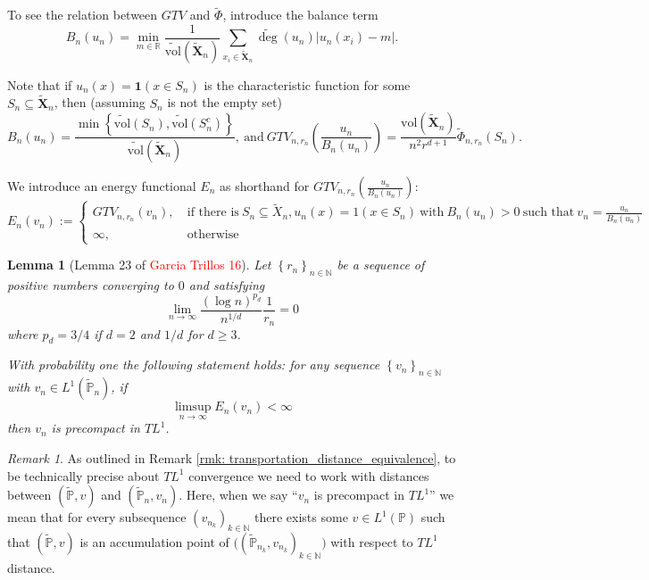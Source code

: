 \documentclass{article}
\newcommand{\Reals}{\mathbb{R}}
\newcommand{\abs}[1]{\left \lvert #1 \right \rvert}
\newcommand{\set}[1]{\left\{#1\right\}}
\newcommand{\seq}[1]{\set{#1}_{n \in \N}}
\newcommand{\Naturals}{\mathbb{N}}
\newcommand{\N}{\mathbb{N}}
\newcommand{\Xbf}{\mathbf{X}}
\newcommand{\Pbb}{\mathbb{P}}
\newcommand{\1}{\mathbf{1}}
\newcommand{\vol}{\mathrm{vol}}
\theoremstyle{alden}
\theoremstyle{aldenthm}
\newtheorem{lemma}{Lemma}
\theoremstyle{remark}
\newtheorem{remark}{Remark}
\begin{document}
To see the relation between $GTV$ and $\widetilde{\Phi}$, introduce the balance term
\begin{equation*}
B_n(u_n) = \min_{m \in \Reals} \frac{1}{\widetilde{\vol}(\widetilde{\Xbf}_n)} \sum_{x_i \in \widetilde{\Xbf}_n} \widetilde{\deg}(u_n) \abs{u_n(x_i) - m}.
\end{equation*}

Note that if $u_n(x) = \1(x \in S_n)$ is the characteristic function for some $S_n \subseteq \widetilde{\Xbf}_n$, then (assuming $S_n$ is not the empty set)
\begin{equation*}
B_n(u_n) = \frac{\min \set{ \widetilde{\vol}(S_n) , \widetilde{\vol}(S_n^c) }}{\widetilde{\vol}(\widetilde{\Xbf}_n)}, ~\text{and}~ GTV_{n,r_n}\left(\frac{u_n}{B_n(u_n)}\right) = \frac{\vol(\widetilde{\Xbf}_n)}{n^2 r^{d+1}}\widetilde{\Phi}_{n,r_n}(S_n).
\end{equation*}

We introduce an energy functional $E_n$ as shorthand for $GTV_{n,r_n}\left(\frac{u_n}{B_n(u_n)}\right)$:
\begin{equation*}
E_n(v_n) := 
\begin{cases}
GTV_{n,r_n}(v_n),~ & \text{if there is}~ S_n \subseteq \widetilde{X}_n, u_n(x) = 1(x \in S_n) ~\text{with}~ B_n(u_n) > 0 ~\text{such that}~ v_n = \frac{u_n}{B_n(u_n)} \\
\infty,~ & \text{otherwise}
\end{cases}
\end{equation*}

\begin{lemma}[Lemma 23 of \textcolor{red}{Garcia Trillos 16}]
	\label{lem: gt_precompactness}
	Let $\seq{r_n}$ be a sequence of positive numbers converging to $0$ and satisfying
	\begin{equation*}
	\lim_{n \to \infty} \frac{(\log n)^{p_d}}{n^{1/d}} \frac{1}{r_n} = 0
	\end{equation*}
	where $p_d = 3/4$ if $d = 2$ and $1/d$ for $d \geq 3$.
	
	With probability one the following statement holds: for any sequence $\seq{v_n}$ with $v_n \in L^1(\widetilde{\Pbb}_n)$, if
	\begin{equation*}
	\limsup_{n \to \infty} E_n(v_n)  < \infty
	\end{equation*}
	then $v_n$ is precompact in $TL^1$. 
\end{lemma}

\begin{remark}
	As outlined in Remark \ref{rmk: transportation_distance_equivalence}, to be technically precise about $TL^1$ convergence we need to work with distances between $(\widetilde{\Pbb}, v)$ and $(\widetilde{\Pbb}_n, v_n)$. Here, when we say ``$v_n$ is precompact in $TL^1$'' we mean that for every subsequence $(v_{n_k})_{k \in \Naturals}$ there exists some $v \in L^1(\Pbb)$ such that $(\widetilde{\Pbb}, v)$ is an accumulation point of $\bigl( (\widetilde{\Pbb}_{n_k},v_{n_k})_{k \in \Naturals} \bigr)$ with respect to $TL^1$ distance. 
\end{remark}
\end{document}

